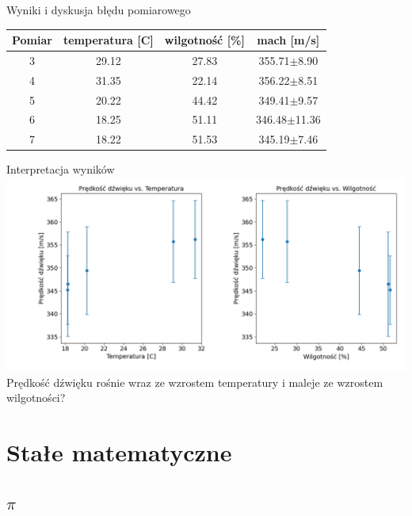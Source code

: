 \documentclass{beamer}
\begin{document}
\begin{frame}{Wyniki i dyskusja błędu pomiarowego}
	\centering
	\begin{tabular}{cccc}
		\toprule
		Pomiar & temperatura [C] & wilgotność [\%] & mach [m/s]       \\
		\midrule
		3      & 29.12           & 27.83           & 355.71$\pm$8.90  \\
		4      & 31.35           & 22.14           & 356.22$\pm$8.51  \\
		5      & 20.22           & 44.42           & 349.41$\pm$9.57  \\
		6      & 18.25           & 51.11           & 346.48$\pm$11.36 \\
		7      & 18.22           & 51.53           & 345.19$\pm$7.46  \\
		\bottomrule
	\end{tabular}

\end{frame}

\begin{frame}{Interpretacja wyników}
	\includegraphics[width=\linewidth]{temp_humid_mach.png}
	Prędkość dźwięku rośnie wraz ze wzrostem temperatury i maleje ze wzrostem wilgotności?
\end{frame}

\section{Stałe matematyczne}

\subsection{$\pi$}
\end{document}
